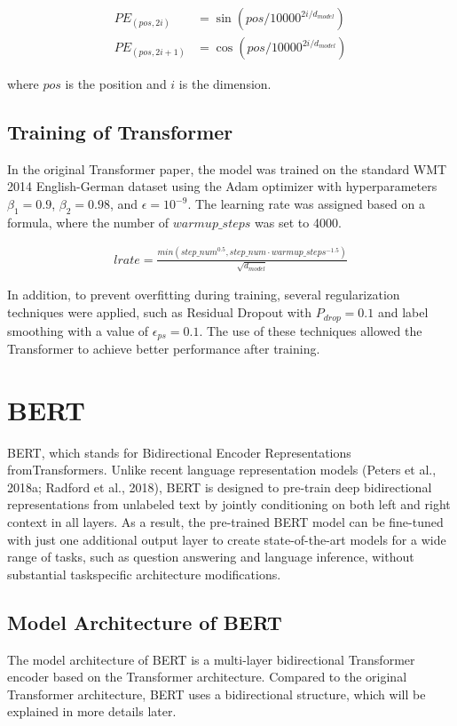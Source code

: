 \documentclass[conference]{IEEEtran}
\begin{document}
\begin{align*}
    PE_{(pos,2i)} &= \sin(pos/10000^{2i/d_{model}})\\
    PE_{(pos,2i+1)} &= \cos(pos/10000^{2i/d_{model}})
\end{align*}

\par where $pos$ is the position and $i$ is the dimension.


\subsection{Training of Transformer}
\par In the original Transformer paper, the model was trained on the standard WMT 2014 English-German 
dataset using the Adam optimizer with hyperparameters $\beta_1 = 0.9$, $\beta_2 = 0.98$, and 
$ \epsilon = 10^{-9}$. The learning rate was assigned based on a formula, where the number 
of $warmup\_steps$ was set to 4000.

\begin{align*}
    lrate = \frac{min({step\_num}^{0.5}, step\_num \cdot warmup\_steps^{-1.5})}{\sqrt{d_{model}}}
\end{align*}

\par In addition, to prevent overfitting during training, several regularization 
techniques were applied, such as Residual Dropout with $P_{drop} = 0.1$ and label 
smoothing with a value of $\epsilon_{ps} = 0.1$. The use of these techniques allowed 
the Transformer to achieve better performance after training.

\section{BERT}

\par BERT, which stands for Bidirectional Encoder Representations fromTransformers. 
Unlike recent language representation models (Peters et al., 2018a; Radford et al., 2018), 
BERT is designed to pre-train deep bidirectional representations from
unlabeled text by jointly conditioning on both left and right context in all layers. As a 
result, the pre-trained BERT model can be fine-tuned with just one additional output layer
to create state-of-the-art models for a wide range of tasks, such as question answering and
language inference, without substantial taskspecific architecture modifications.

\subsection{Model Architecture of BERT}
\par The model architecture of BERT is a multi-layer bidirectional Transformer encoder 
based on the Transformer architecture. Compared to the original Transformer architecture, 
BERT uses a bidirectional structure, which will be explained in more details later.
\end{document}
